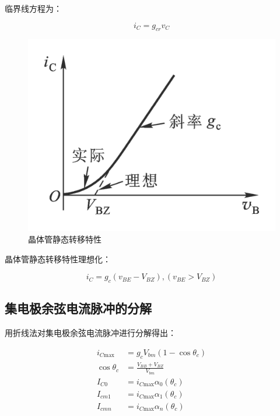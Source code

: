 临界线方程为：

\begin{equation}
    i_C = g_{cr} v_C
\end{equation}

\begin{figure}[htbp]
    \centering
    \includegraphics[scale=0.3]{image/Picture3.png}
    \caption{晶体管静态转移特性}
\end{figure}

晶体管静态转移特性理想化：

\begin{equation}
    i_C = g_c (v_{BE} - V_{BZ}), (v_{BE} > V_{BZ}) 
\end{equation}

\subsection{集电极余弦电流脉冲的分解}

用折线法对集电极余弦电流脉冲进行分解得出：

\begin{equation}
\begin{aligned}
    i_{C \text{max}}  &= g_c V_{bm} (1 - \cos{\theta_c}) \\
    \cos{\theta_c} &= \frac{V_{BB} + V_{BZ}}{V_{bm}} \\
    I_{C0}  &= i_{C \text{max}} \alpha_0(\theta_c) \\
    I_{cm1} &= i_{C \text{max}} \alpha_1(\theta_c) \\
    I_{cmn} &= i_{C \text{max}} \alpha_n(\theta_c) 
\end{aligned}
\end{equation}

